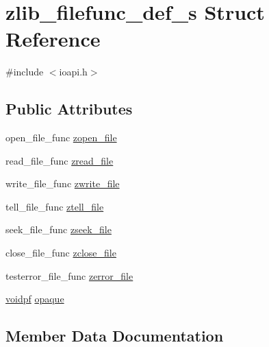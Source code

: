 \hypertarget{structzlib__filefunc__def__s}{}\section{zlib\+\_\+filefunc\+\_\+def\+\_\+s Struct Reference}
\label{structzlib__filefunc__def__s}


{\ttfamily \#include $<$ioapi.\+h$>$}

\subsection*{Public Attributes}
\begin{DoxyCompactItemize}
\item 
open\+\_\+file\+\_\+func \hyperlink{structzlib__filefunc__def__s_a49b78a559140e495b94af4d9dfe5c4e9}{zopen\+\_\+file}
\item 
read\+\_\+file\+\_\+func \hyperlink{structzlib__filefunc__def__s_ab14f748de7516525e5d2b78c47aca92e}{zread\+\_\+file}
\item 
write\+\_\+file\+\_\+func \hyperlink{structzlib__filefunc__def__s_a710b490fec793486ef5bedd9f2e1136d}{zwrite\+\_\+file}
\item 
tell\+\_\+file\+\_\+func \hyperlink{structzlib__filefunc__def__s_ac8b933601443cdd83f8cc02004c77d0d}{ztell\+\_\+file}
\item 
seek\+\_\+file\+\_\+func \hyperlink{structzlib__filefunc__def__s_a4747bdf97a3f44fe4b958114c11e1dcf}{zseek\+\_\+file}
\item 
close\+\_\+file\+\_\+func \hyperlink{structzlib__filefunc__def__s_ac46ac7ec0540dce117dab3f210d26763}{zclose\+\_\+file}
\item 
testerror\+\_\+file\+\_\+func \hyperlink{structzlib__filefunc__def__s_a61182b5b3ff83fb509b57ab4d2d9816d}{zerror\+\_\+file}
\item 
\hyperlink{ioapi_8h_a39ab6d73c1cd44bc17064c2dcbb3e753}{voidpf} \hyperlink{structzlib__filefunc__def__s_a494b6d634b61bdc7fc7caed8e4fbe3f4}{opaque}
\end{DoxyCompactItemize}


\subsection{Member Data Documentation}
\mbox{\label{structzlib__filefunc__def__s_a494b6d634b61bdc7fc7caed8e4fbe3f4}} 
